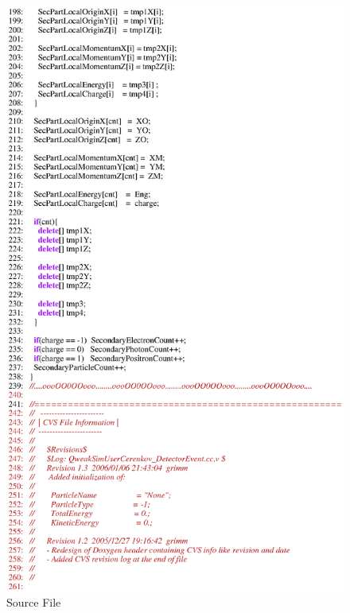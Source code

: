 \begin{figure}[ht]
  \hspace{0cm}
  \includegraphics[scale=0.8]{./figures5/QweakSimUserCerenkov_DetectorEvent.cc-p4.eps}
  \caption{\label{SourceV39} Source File}
           \label{fig:V-SC-42}
\end{figure}

\clearpage


